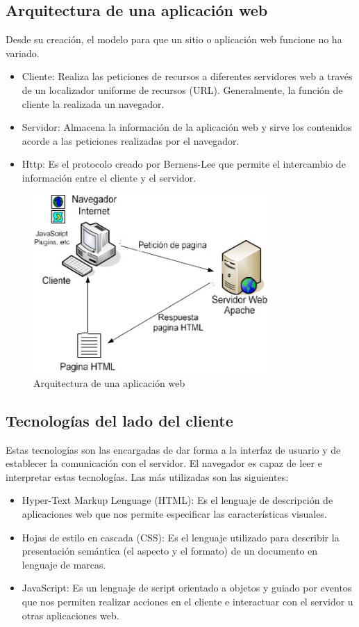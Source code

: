 \subsection{Arquitectura de una aplicación web}
Desde su creación, el modelo para que un sitio o aplicación web funcione no ha variado.
\begin{itemize}
	\item Cliente: Realiza las peticiones de recursos a diferentes servidores web a través de un localizador uniforme de recursos (URL). Generalmente, la función de cliente la realizada un navegador.
	\item Servidor: Almacena la información de la aplicación web y sirve los contenidos acorde a las peticiones realizadas por el navegador.
	\item Http: Es el protocolo creado por Bernens-Lee que permite el intercambio de información entre el cliente y el servidor.
\end{itemize}
\begin{figure}[H]
  \begin{center}
    \includegraphics[width=0.8\textwidth]{figures/arquitecturaweb.jpg}
		\caption{Arquitectura de una aplicación web}
		\label{fig.arquitecturaweb}
		\end{center}
\end{figure}

\subsection{Tecnologías del lado del cliente}
Estas tecnologías son las encargadas de dar forma a la interfaz de usuario y de establecer la comunicación con el servidor. El navegador es capaz de leer e interpretar estas tecnologías. Las más utilizadas son las siguientes:
\begin{itemize}
	\item Hyper-Text Markup Lenguage (HTML): Es el lenguaje de descripción de aplicaciones web que nos permite especificar las características visuales.
	\item Hojas de estilo en cascada (CSS): Es el lenguaje utilizado para describir la presentación semántica (el aspecto y el formato) de un documento en lenguaje de marcas.
	\item JavaScript: Es un lenguaje de script orientado a objetos y guiado por eventos que nos permiten realizar acciones en el cliente e interactuar con el servidor u otras aplicaciones web.
\end{itemize}

